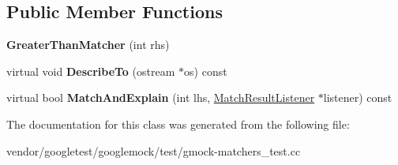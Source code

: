 \subsection*{Public Member Functions}
\begin{DoxyCompactItemize}
\item 
\mbox{\label{classtesting_1_1gmock__matchers__test_1_1_greater_than_matcher_a605c50137599a1dba0701bbd735bf1e8}} 
{\bfseries Greater\+Than\+Matcher} (int rhs)
\item 
\mbox{\label{classtesting_1_1gmock__matchers__test_1_1_greater_than_matcher_a49ea904382d0f5b80ccf622423ab0d94}} 
virtual void {\bfseries Describe\+To} (ostream $\ast$os) const
\item 
\mbox{\label{classtesting_1_1gmock__matchers__test_1_1_greater_than_matcher_a85a583852003638507d872238bcf7c0f}} 
virtual bool {\bfseries Match\+And\+Explain} (int lhs, \hyperlink{classtesting_1_1_match_result_listener}{Match\+Result\+Listener} $\ast$listener) const
\end{DoxyCompactItemize}


The documentation for this class was generated from the following file\+:\begin{DoxyCompactItemize}
\item 
vendor/googletest/googlemock/test/gmock-\/matchers\+\_\+test.\+cc\end{DoxyCompactItemize}
